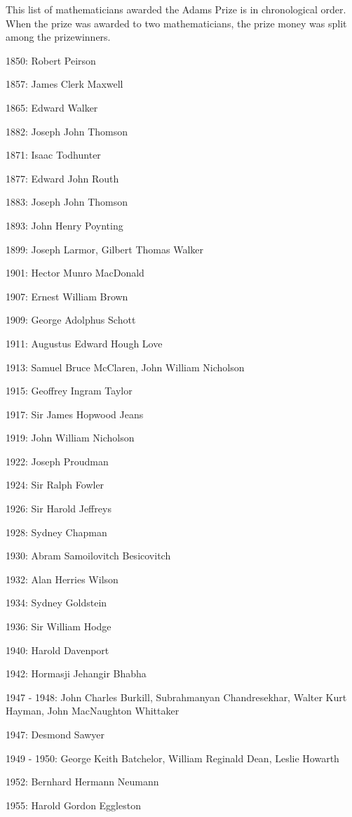 \documentclass[12pt]{article}
\begin{document}

This list of mathematicians awarded the Adams Prize is in chronological order. When the prize was awarded to two mathematicians, the prize money was split among the prizewinners.

1850: Robert Peirson

1857: James Clerk Maxwell

1865: Edward Walker

1882: Joseph John Thomson

1871: Isaac Todhunter

1877: Edward John Routh

1883: Joseph John Thomson

1893: John Henry Poynting

1899: Joseph Larmor, Gilbert Thomas Walker

1901: Hector Munro MacDonald

1907: Ernest William Brown

1909: George Adolphus Schott

1911: Augustus Edward Hough Love

1913: Samuel Bruce McClaren, John William Nicholson

1915: Geoffrey Ingram Taylor

1917: Sir James Hopwood Jeans

1919: John William Nicholson

1922: Joseph Proudman

1924: Sir Ralph Fowler

1926: Sir Harold Jeffreys

1928: Sydney Chapman

1930: Abram Samoilovitch Besicovitch

1932: Alan Herries Wilson

1934: Sydney Goldstein

1936: Sir William Hodge

1940: Harold Davenport

1942: Hormasji Jehangir Bhabha

1947 - 1948: John Charles Burkill, Subrahmanyan Chandresekhar, Walter Kurt Hayman, John MacNaughton Whittaker

1947: Desmond Sawyer

1949 - 1950: George Keith Batchelor, William Reginald Dean, Leslie Howarth

1952: Bernhard Hermann Neumann

1955: Harold Gordon Eggleston
\end{document}
